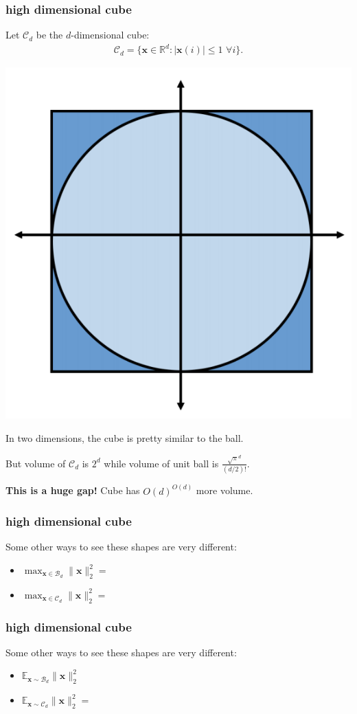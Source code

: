 \documentclass[compress]{beamer}
\newcommand{\bv}[1]{\mathbf{#1}}
\newcommand{\R}{\mathbb{R}}
\newcommand{\E}{\mathbb{E}}
\begin{document}
\begin{frame}[t]
	\frametitle{high dimensional cube}
	Let $\mathcal{C}_d$ be the $d$-dimensional cube: 
	\begin{align*}
	\mathcal{C}_d = \{\bv{x}\in \R^d : |\bv{x}(i)| \leq 1 \,\, \forall i\}. 
	\end{align*}
	\begin{center}
		\vspace{-1em}
		\includegraphics[width=.4\textwidth]{2dcube.png}
		
		\vspace{-.5em}
		In two dimensions, the cube is pretty similar to the ball. 
		
			But volume of $\mathcal{C}_d$ is $2^d$ while volume of unit ball is $\frac{\sqrt{\pi}^{d}}{(d/2)!}.$ 
			
			\alert{\textbf{This is a huge gap!}} Cube has $O(d)^{O(d)}$ more volume.
	\end{center}
\end{frame}

\begin{frame}
	\frametitle{high dimensional cube}
	Some other ways to see these shapes are very different:
	\begin{itemize}
		\item $\max_{\bv{x} \in \mathcal{B}_d} \|\bv{x}\|_2^2 = $
		\item $\max_{\bv{x} \in \mathcal{C}_d} \|\bv{x}\|_2^2 = $
	\end{itemize}
\end{frame}

\begin{frame}
	\frametitle{high dimensional cube}
	Some other ways to see these shapes are very different:
	\begin{itemize}
		\item $\E_{\bv{x} \sim \mathcal{B}_d} \|\bv{x}\|_2^2 $
		\item $\E_{\bv{x} \sim \mathcal{C}_d} \|\bv{x}\|_2^2 = $
	\end{itemize}
\end{frame}
\end{document}
